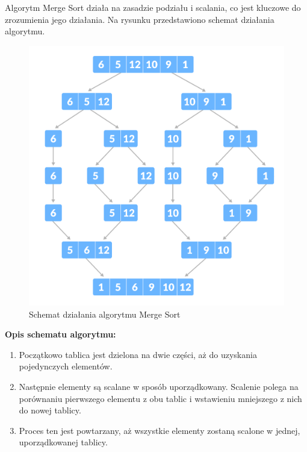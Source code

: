 Algorytm Merge Sort działa na zasadzie podziału i scalania, co jest kluczowe do zrozumienia jego działania.
Na rysunku  przedstawiono schemat działania algorytmu.

\begin{figure}[!htb]
  \begin{center}
    \includegraphics[width=\textwidth]{rys/merge_sort_example.png}
    \caption{Schemat działania algorytmu Merge Sort \protect\footnotemark}
    \label{rys:merge_sort_algorithm}
  \end{center}
\end{figure}


\textbf{Opis schematu algorytmu:}

\begin{enumerate}
  \item Początkowo tablica jest dzielona na dwie części, aż do uzyskania pojedynczych elementów.
  \item Następnie elementy są scalane w sposób uporządkowany. Scalenie polega na porównaniu pierwszego elementu z obu tablic i wstawieniu mniejszego z nich do nowej tablicy.
  \item Proces ten jest powtarzany, aż wszystkie elementy zostaną scalone w jednej, uporządkowanej tablicy.
\end{enumerate}

